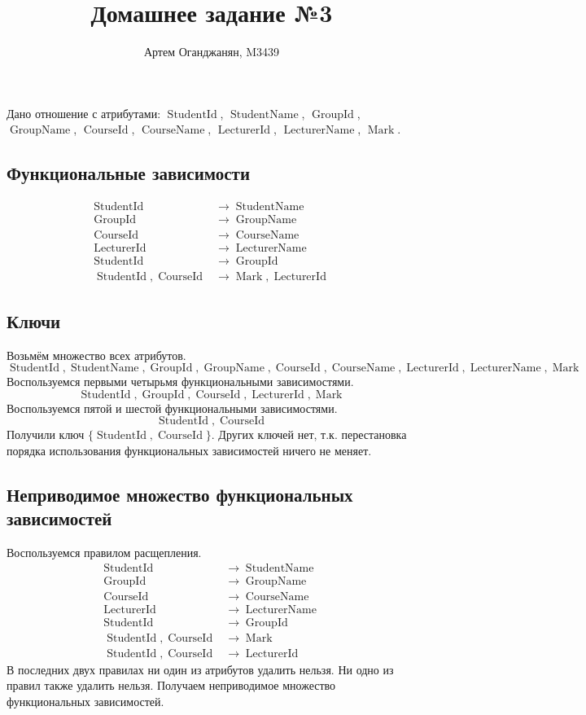 \documentclass{article}
\title{Домашнее задание №3}
\author{Артем Оганджанян, M3439}
\date{}
\DeclareMathOperator{\StudentId}{StudentId}
\DeclareMathOperator{\StudentName}{StudentName}
\DeclareMathOperator{\GroupId}{GroupId}
\DeclareMathOperator{\GroupName}{GroupName}
\DeclareMathOperator{\CourseId}{CourseId}
\DeclareMathOperator{\CourseName}{CourseName}
\DeclareMathOperator{\LecturerId}{LecturerId}
\DeclareMathOperator{\LecturerName}{LecturerName}
\DeclareMathOperator{\Mark}{Mark}
\begin{document}
\maketitle

Дано отношение с атрибутами:
$\StudentId$,
$\StudentName$,
$\GroupId$,
$\GroupName$,
$\CourseId$,
$\CourseName$,
$\LecturerId$,
$\LecturerName$,
$\Mark$.

\subsection{\texorpdfstring{Функциональные зависимости}{Task 1}}

\begin{align*}
    \StudentId            &\rightarrow \StudentName  \\
    \GroupId              &\rightarrow \GroupName    \\
    \CourseId             &\rightarrow \CourseName   \\
    \LecturerId           &\rightarrow \LecturerName \\
    \StudentId            &\rightarrow \GroupId      \\
    \StudentId, \CourseId &\rightarrow \Mark, \LecturerId
\end{align*}

\subsection{\texorpdfstring{Ключи}{Task 2}}

Возьмём множество всех атрибутов.
\[
    \StudentId,
    \StudentName,
    \GroupId,
    \GroupName,
    \CourseId,
    \CourseName,
    \LecturerId,
    \LecturerName,
    \Mark
\]
Воспользуемся первыми четырьмя функциональными зависимостями.
\[
    \StudentId,
    \GroupId,
    \CourseId,
    \LecturerId,
    \Mark
\]
Воспользуемся пятой и шестой функциональными зависимостями.
\[
    \StudentId,
    \CourseId
\]
Получили ключ $\{\StudentId, \CourseId\}$. Других ключей нет, т.к. перестановка
порядка использования функциональных зависимостей ничего не меняет.

\subsection{\texorpdfstring{Неприводимое множество функциональных зависимостей}
    {Task3}}
Воспользуемся правилом расщепления.
\begin{align*}
    \StudentId            &\rightarrow \StudentName  \\
    \GroupId              &\rightarrow \GroupName    \\
    \CourseId             &\rightarrow \CourseName   \\
    \LecturerId           &\rightarrow \LecturerName \\
    \StudentId            &\rightarrow \GroupId      \\
    \StudentId, \CourseId &\rightarrow \Mark         \\
    \StudentId, \CourseId &\rightarrow \LecturerId
\end{align*}
В последних двух правилах ни один из атрибутов удалить нельзя.
Ни одно из правил также удалить нельзя. Получаем неприводимое множество
функциональных зависимостей.
\end{document}
